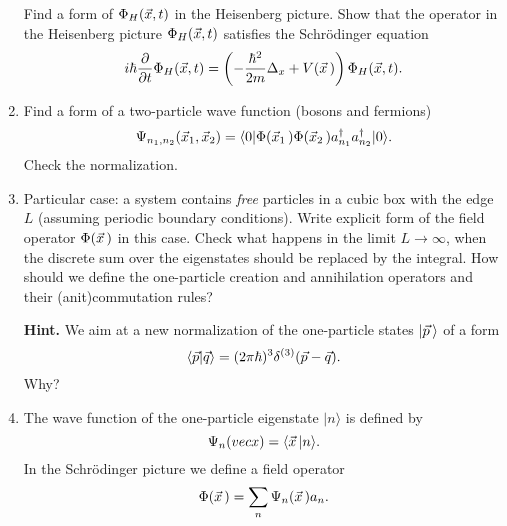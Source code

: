\documentclass[a4paper,11pt]{article}
\begin{document}
\begin{enumerate}
  Find a form of $\Phi_{ H }( \vec{x}, t )$ in the Heisenberg picture.
  Show that the operator in the Heisenberg picture $\Phi_{ H }( \vec{x}, t )$
  satisfies the Schr\"{o}dinger equation
  \begin{equation}
    \label{eq:26}
    i \hbar \frac{ \partial }{ \partial t } \Phi_{ H }( \vec{x}, t )
    =
    \left( -\frac{ \hbar^{ 2 } }{ 2m } \Delta_{ x } + V( \vec{x} \, ) \right)
    \Phi_{ H }( \vec{x}, t ).
  \end{equation}



\item Find a form of a two-particle wave function (bosons and fermions)
  \begin{equation}
    \label{eq:27}
    \Psi_{ n_{ 1 }, n_{ 2 } }( \vec{x}_{ 1 }, \vec{x}_{ 2 } ) =
    \langle 0 | \Phi( \vec{x}_{ 1 } \, ) \Phi( \vec{x}_{ 2 } \, )
    a_{ n_{ 1 } }^{ \dagger } a_{ n_{ 2 } }^{ \dagger } | 0 \rangle.
  \end{equation}
  Check the normalization.

\item Particular case: a system contains \textit{free} particles in a cubic
  box with the edge $L$ (assuming periodic boundary conditions). Write
  explicit form of the field operator $\Phi( \vec{x} \, )$ in this case. Check
  what happens in the limit $L \to \infty$, when the discrete sum over the
  eigenstates should be replaced by the integral. How should we define the
  one-particle creation and annihilation operators and their
  (anit)commutation rules?

  \textbf{Hint.} We aim at a new normalization of the one-particle states
  $| \vec{p} \, \rangle$ of a form
  \begin{equation}
    \label{eq:28}
    \langle \vec{p} | \vec{q} \rangle = ( 2\pi \hbar )^{ 3 } \delta^{ ( 3 ) }( \vec{p} - \vec{q} ).
  \end{equation}
  Why?



\item The wave function of the one-particle eigenstate $| n \rangle$ is defined by
  \begin{equation}
    \label{eq:20}
    \Psi_{ n }( vecx ) = \langle \vec{x} \, | n \rangle.
  \end{equation}
  In the Schr\"{o}dinger picture we define a field operator
  \begin{equation}
    \label{eq:21}
    \Phi( \vec{x} \, ) = \sum_{ n } \Psi_{ n }( \vec{x} \, ) a_{ n }.
  \end{equation}




\end{enumerate}
\end{document}
